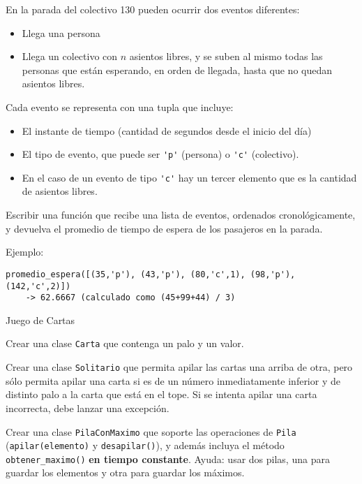 \begin{ejercicio}
En la parada del colectivo 130 pueden ocurrir dos eventos diferentes:

\begin{itemize}[nosep]
    \item Llega una persona
    \item Llega un colectivo con $n$ asientos libres, y se suben al mismo todas las personas que están
esperando, en orden de llegada, hasta que no quedan asientos libres.
\end{itemize}

\noindent
Cada evento se representa con una tupla que incluye:
\begin{itemize}[nosep]
    \item El instante de tiempo (cantidad de segundos desde el inicio del día)
    \item El tipo de evento, que puede ser \verb|'p'| (persona) o \verb|'c'| (colectivo).
    \item En el caso de un evento de tipo \verb|'c'| hay un tercer elemento que es
        la cantidad de asientos libres.
\end{itemize}

Escribir una función que recibe una lista de eventos, ordenados
cronológicamente, y devuelva el promedio de tiempo de espera de los pasajeros
en la parada.

Ejemplo:
\begin{lstlisting}[numbers=none]
promedio_espera([(35,'p'), (43,'p'), (80,'c',1), (98,'p'), (142,'c',2)])
    -> 62.6667 (calculado como (45+99+44) / 3)
\end{lstlisting}
\end{ejercicio}

\begin{ejercicio}
Juego de Cartas
\begin{partes}
    \item Crear una clase \verb|Carta| que contenga un palo y un valor.
    \item Crear una clase \verb|Solitario| que permita apilar las cartas una
arriba de otra, pero sólo permita apilar una carta si es de un número
inmediatamente inferior y de distinto palo a la carta que está en el tope.  Si
se intenta apilar una carta incorrecta, debe lanzar una excepción.
\end{partes}
\end{ejercicio}

\begin{ejercicio}
Crear una clase \verb|PilaConMaximo| que soporte las operaciones de \verb|Pila|
(\verb|apilar(elemento)| y \verb|desapilar()|), y además incluya el método
\verb|obtener_maximo()| {\bf en tiempo constante}.  Ayuda: usar dos pilas, una
para guardar los elementos y otra para guardar los máximos.
\end{ejercicio}

